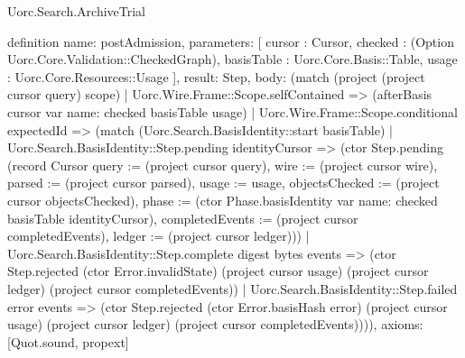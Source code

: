 \begin{lexlean}{Uorc.Search.ArchiveTrial}
\begin{semanticmodule}
definition{
  name: postAdmission,
  parameters: [
    cursor : Cursor,
    checked : (Option Uorc.Core.Validation::CheckedGraph),
    basisTable : Uorc.Core.Basis::Table,
    usage : Uorc.Core.Resources::Usage
  ],
  result: Step,
  body: (match (project (project cursor query) scope)
    | Uorc.Wire.Frame::Scope.selfContained => (afterBasis cursor var{
      name: checked
    } basisTable usage)
    | Uorc.Wire.Frame::Scope.conditional expectedId => (match (Uorc.Search.BasisIdentity::start basisTable)
      | Uorc.Search.BasisIdentity::Step.pending identityCursor => (ctor Step.pending (record Cursor {query := (project cursor query), wire := (project cursor wire), parsed := (project cursor parsed), usage := usage, objectsChecked := (project cursor objectsChecked), phase := (ctor Phase.basisIdentity var{
        name: checked
      } basisTable identityCursor), completedEvents := (project cursor completedEvents), ledger := (project cursor ledger)}))
      | Uorc.Search.BasisIdentity::Step.complete digest bytes events => (ctor Step.rejected (ctor Error.invalidState) (project cursor usage) (project cursor ledger) (project cursor completedEvents))
      | Uorc.Search.BasisIdentity::Step.failed error events => (ctor Step.rejected (ctor Error.basisHash error) (project cursor usage) (project cursor ledger) (project cursor completedEvents)))),
  axioms: [Quot.sound, propext]
}


\end{semanticmodule}
\end{lexlean}
